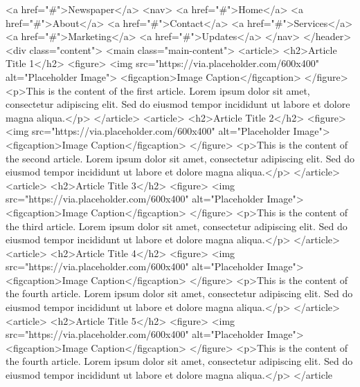         <a href="#">Newspaper</a>
        <nav>
            <a href="#">Home</a>
            <a href="#">About</a>
            <a href="#">Contact</a>
            <a href="#">Services</a>
            <a href="#">Marketing</a>
            <a href="#">Updates</a>
        </nav>
    </header>
    <div class="content">
        <main class="main-content">
            <article>
                <h2>Article Title 1</h2>
                <figure>
                    <img src="https://via.placeholder.com/600x400" alt="Placeholder Image">
                    <figcaption>Image Caption</figcaption>
                </figure>
                <p>This is the content of the first article. Lorem ipsum dolor sit amet, consectetur adipiscing elit.
                    Sed do eiusmod tempor incididunt ut labore et dolore magna aliqua.</p>
            </article>
            <article>
                <h2>Article Title 2</h2>
                <figure>
                    <img src="https://via.placeholder.com/600x400" alt="Placeholder Image">
                    <figcaption>Image Caption</figcaption>
                </figure>
                <p>This is the content of the second article. Lorem ipsum dolor sit amet, consectetur adipiscing elit.
                    Sed do eiusmod tempor incididunt ut labore et dolore magna aliqua.</p>
            </article>
            <article>
                <h2>Article Title 3</h2>
                <figure>
                    <img src="https://via.placeholder.com/600x400" alt="Placeholder Image">
                    <figcaption>Image Caption</figcaption>
                </figure>
                <p>This is the content of the third article. Lorem ipsum dolor sit amet, consectetur adipiscing elit.
                    Sed do eiusmod tempor incididunt ut labore et dolore magna aliqua.</p>
            </article>
            <article>
                <h2>Article Title 4</h2>
                <figure>
                    <img src="https://via.placeholder.com/600x400" alt="Placeholder Image">
                    <figcaption>Image Caption</figcaption>
                </figure>
                <p>This is the content of the fourth article. Lorem ipsum dolor sit amet, consectetur adipiscing elit.
                    Sed do eiusmod tempor incididunt ut labore et dolore magna aliqua.</p>
            </article>
            <article>
                <h2>Article Title 5</h2>
                <figure>
                    <img src="https://via.placeholder.com/600x400" alt="Placeholder Image">
                    <figcaption>Image Caption</figcaption>
                </figure>
                <p>This is the content of the fourth article. Lorem ipsum dolor sit amet, consectetur adipiscing elit.
                    Sed do eiusmod tempor incididunt ut labore et dolore magna aliqua.</p>
            </article

